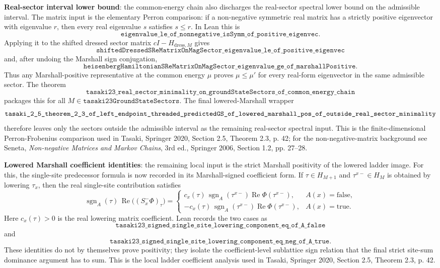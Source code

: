 \documentclass[a4paper,11pt]{article}
\begin{document}
\textbf{Real-sector interval lower bound}: the common-energy chain also
discharges the real-sector spectral lower bound on the admissible
interval.  The matrix input is the elementary Perron comparison: if a
non-negative symmetric real matrix has a strictly positive eigenvector
with eigenvalue \(r\), then every real eigenvalue \(s\) satisfies
\(s\le r\).  In Lean this is
\[
\texttt{eigenvalue\_le\_of\_nonnegative\_isSymm\_of\_positive\_eigenvec}.
\]
Applying it to the shifted dressed sector matrix
\(cI-H_{\mathrm{dress},M}\) gives
\[
\texttt{shiftedDressedSReMatrixOnMagSector\_eigenvalue\_le\_of\_positive\_eigenvec}
\]
and, after undoing the Marshall sign conjugation,
\[
\texttt{heisenbergHamiltonianSReMatrixOnMagSector\_eigenvalue\_ge\_of\_marshallPositive}.
\]
Thus any Marshall-positive representative at the common energy \(\mu\)
proves \(\mu\le\mu'\) for every real-form eigenvector in the same
admissible sector.  The theorem
\[
\texttt{tasaki23\_real\_sector\_minimality\_on\_groundStateSectors\_of\_common\_energy\_chain}
\]
packages this for all \(M\in\texttt{tasaki23GroundStateSectors}\).
The final lowered-Marshall wrapper
\[
\texttt{tasaki\_2\_5\_theorem\_2\_3\_of\_left\_endpoint\_threaded\_predictedGS}\\
\texttt{\_of\_lowered\_marshall\_pos\_of\_outside\_real\_sector\_minimality}
\]
therefore leaves only the sectors outside the admissible interval as the
remaining real-sector spectral input.  This is the finite-dimensional
Perron-Frobenius comparison used in Tasaki, Springer 2020,
Section 2.5, Theorem 2.3, p. 42; for the non-negative-matrix
background see Seneta, \emph{Non-negative Matrices and Markov Chains},
3rd ed., Springer 2006, Section 1.2, pp. 27--28.

\textbf{Lowered Marshall coefficient identities}: the remaining local
input is the strict Marshall positivity of the lowered ladder image.
For this, the single-site predecessor formula is now recorded in its
Marshall-signed coefficient form.  If \(\tau\in H_{M+1}\) and
\(\tau^{x-}\in H_M\) is obtained by lowering \(\tau_x\), then the real
single-site contribution satisfies
\[
  \operatorname{sgn}_A(\tau)\,
    \operatorname{Re}\bigl((S_x^-\Phi)_\tau\bigr)
  =
  \begin{cases}
    c_x(\tau)\,
      \operatorname{sgn}_A(\tau^{x-})
      \operatorname{Re}\Phi(\tau^{x-}), & A(x)=\mathrm{false},\\
    -c_x(\tau)\,
      \operatorname{sgn}_A(\tau^{x-})
      \operatorname{Re}\Phi(\tau^{x-}), & A(x)=\mathrm{true}.
  \end{cases}
\]
Here \(c_x(\tau)>0\) is the real lowering matrix coefficient.  Lean
records the two cases as
\[
\texttt{tasaki23\_signed\_single\_site\_lowering\_component\_eq\_of\_A\_false}
\]
and
\[
\texttt{tasaki23\_signed\_single\_site\_lowering\_component\_eq\_neg\_of\_A\_true}.
\]
These identities do not by themselves prove positivity; they isolate the
coefficient-level sublattice sign relation that the final strict
site-sum dominance argument has to sum.  This is the local ladder
coefficient analysis used in Tasaki, Springer 2020, Section 2.5,
Theorem 2.3, p. 42.
\end{document}
